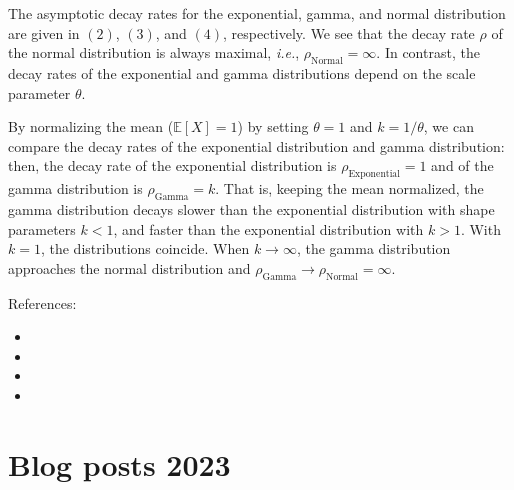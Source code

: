 \documentclass{article}
\begin{document}
The asymptotic decay rates for the exponential, gamma, and normal distribution are given in $(2)$, $(3)$, and $(4)$, respectively. We see that the decay rate $\rho$ of the normal distribution is always maximal, \textit{i.e.}, $\rho_{\text{Normal}} = \infty$. In contrast, the decay rates of the exponential and gamma distributions depend on the scale parameter $\theta$.

By normalizing the mean ($\mathbb{E}[X] = 1$) by setting $\theta = 1$ and $k=1/\theta$, we can compare the decay rates of the exponential distribution and gamma distribution: then, the decay rate of the exponential distribution is $\rho_{\text{Exponential}} = 1$ and of the gamma distribution is $\rho_{\text{Gamma}} = k$. That is, keeping the mean normalized, the gamma distribution decays slower than the exponential distribution with shape parameters $k<1$, and faster than the exponential distribution with $k>1$. With $k=1$, the distributions coincide. When $k \rightarrow \infty$, the gamma distribution approaches the normal distribution and $\rho_{\text{Gamma}} \rightarrow \rho_{\text{Normal}} = \infty$.


References:
\begin{itemize}
\item {}
\item {}
\item {}
\item {}

\end{itemize}

\section{Blog posts 2023}
\end{document}
